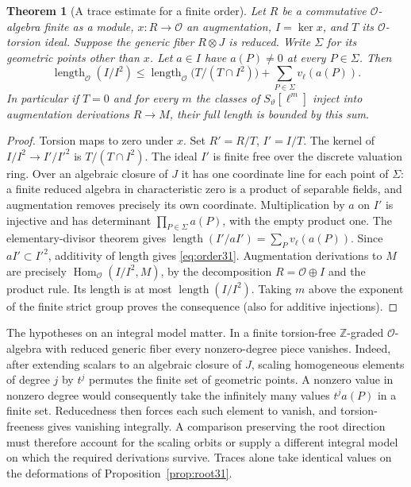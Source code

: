\documentclass[a4paper,11pt]{article}
\newtheorem{theorem}[proposition]{Theorem}
\theoremstyle{definition}
\theoremstyle{remark}
\newcommand{\ZZ}{\mathbb Z}\newcommand{\ord}{\operatorname{ord}}
\newcommand{\len}{\operatorname{length}}\newcommand{\Res}{\operatorname*{Res}}
\numberwithin{equation}{section}
\newcommand{\OO}{\mathcal O}
\begin{document}
\begin{theorem}[A trace estimate for a finite order]\label{thm:order31}
Let \(R\) be a commutative \(\OO\)-algebra finite as a module, \(x:R\to\OO\) an augmentation, \(I=\ker x\), and \(T\) its \(\OO\)-torsion ideal. Suppose the generic fiber \(R\otimes J\) is reduced. Write \(\Sigma\) for its geometric points other than \(x\). Let \(a\in I\) have \(a(P)\ne0\) at every \(P\in\Sigma\). Then
\begin{equation}
 \len_{\OO}(I/I^2)\le
 \len_{\OO}\bigl(T/(T\cap I^2)\bigr)
       +\sum_{P\in\Sigma}v_\ell(a(P)).                         \label{eq:order31}
\end{equation}
In particular if \(T=0\) and for every \(m\) the classes of \(S_\vartheta[\ell^m]\) inject into augmentation derivations \(R\to M\), their full length is bounded by this sum.
\end{theorem}
\begin{proof}
Torsion maps to zero under \(x\). Set \(R'=R/T\), \(I'=I/T\). The kernel of \(I/I^2\to I'/I'^2\) is \(T/(T\cap I^2)\). The ideal \(I'\) is finite free over the discrete valuation ring. Over an algebraic closure of \(J\) it has one coordinate line for each point of \(\Sigma\): a finite reduced algebra in characteristic zero is a product of separable fields, and augmentation removes precisely its own coordinate. Multiplication by \(a\) on \(I'\) is injective and has determinant \(\prod_{P\in\Sigma} a(P)\), with the empty product one. The elementary-divisor theorem gives \(\len(I'/aI')=\sum_P v_\ell(a(P))\). Since \(aI'\subset I'^2\), additivity of length gives \eqref{eq:order31}. Augmentation derivations to \(M\) are precisely \(\operatorname{Hom}_{\OO}(I/I^2,M)\), by the decomposition \(R=\OO\oplus I\) and the product rule. Its length is at most \(\len(I/I^2)\). Taking \(m\) above the exponent of the finite strict group proves the consequence (also for additive injections).
\end{proof}

The hypotheses on an integral model matter. In a finite torsion-free \(\ZZ\)-graded \(\OO\)-algebra with reduced generic fiber every nonzero-degree piece vanishes. Indeed, after extending scalars to an algebraic closure of \(J\), scaling homogeneous elements of degree \(j\) by \(t^j\) permutes the finite set of geometric points. A nonzero value in nonzero degree would consequently take the infinitely many values \(t^j a(P)\) in a finite set. Reducedness then forces each such element to vanish, and torsion-freeness gives vanishing integrally. A comparison preserving the root direction must therefore account for the scaling orbits or supply a different integral model on which the required derivations survive. Traces alone take identical values on the deformations of Proposition~\ref{prop:root31}.
\end{document}
